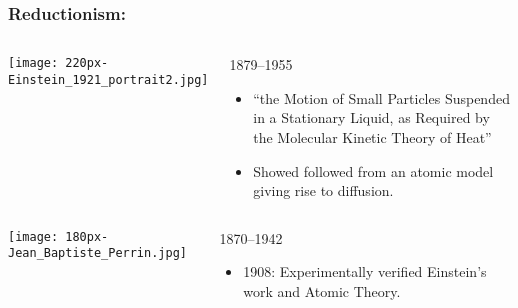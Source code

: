 \begin{frame}
  \frametitle{Reductionism:}

  \begin{columns}
    \texttt{[image: 220px-Einstein\_1921\_portrait2.jpg]}\\
    \begin{block}{
    1879--1955}
    \begin{itemize}
    \item 
       ``the Motion of Small Particles Suspended in a Stationary Liquid, as Required by the Molecular Kinetic Theory of Heat''\cite{einstein1905a,einstein1956a}
    \item 
      Showed  
      followed from an atomic model giving rise to diffusion.
    \end{itemize}
  \end{block}
  \end{columns}

  \medskip

  \begin{columns}
    \texttt{[image: 180px-Jean\_Baptiste\_Perrin.jpg]}\\
    \begin{block}{
        1870--1942}
      \begin{itemize}
      \item 
        1908: Experimentally verified Einstein's work and Atomic Theory.
      \end{itemize}
    \end{block}
  \end{columns}

\end{frame}

